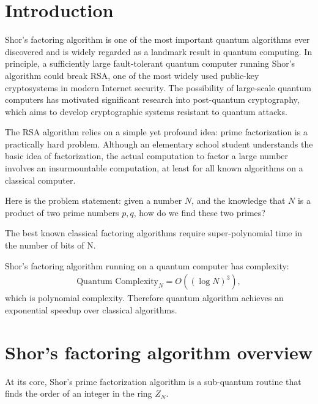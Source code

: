 \Contributor{}

\lstset{style=mystyle}


	\MakeScribeTop


\section{Introduction}
Shor's factoring algorithm is one of the most important quantum algorithms ever discovered and is widely regarded as a landmark result in quantum computing. In principle, a sufficiently large fault-tolerant quantum computer running Shor's algorithm could break RSA, one of the most widely used public-key cryptosystems in modern Internet security. The possibility of large-scale quantum computers has motivated significant research into post-quantum cryptography, which aims to develop cryptographic systems resistant to quantum attacks. 

The RSA algorithm relies on a simple yet profound idea: prime factorization is a practically hard problem. Although an elementary school student understands the basic idea of factorization, the actual computation to factor a large number involves an insurmountable computation, at least for all known algorithms on a classical computer. 

Here is the problem statement: given a number \(N\), and the knowledge that \(N\) is a product of two prime numbers \(p, q\), how do we find these two primes? 

The best known classical factoring algorithms require super-polynomial time in the number of bits of N. 

Shor's factoring algorithm running on a quantum computer has complexity: 
\begin{align*}
    \mbox{Quantum Complexity}_N = O((\log N)^3),
\end{align*}
which is polynomial complexity. Therefore quantum algorithm achieves an exponential speedup over classical algorithms. 

\section{Shor's factoring algorithm overview}
At its core, Shor's prime factorization algorithm is a sub-quantum routine that finds the order of an integer in the ring \(Z_N\). 

